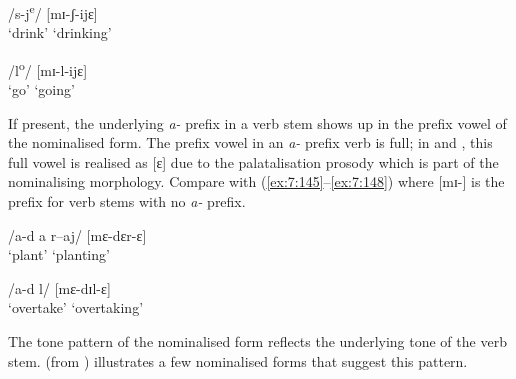 \ea\label{ex:7:150}
 /s-j\textsuperscript{e}/  \hspace{55pt}  [mɪ-ʃ{}-ijɛ]\\
\glt  ‘drink’  \hspace{53pt}   ‘drinking’
\z 

\ea\label{ex:7:151}
  \textup{/l\textsuperscript{o}/ \hspace{65pt}   [mɪ-l-ijɛ}]\\
\glt  ‘go’   \hspace{65pt}   ‘going’
\z 

If present, the underlying \textit{a-} prefix in a verb stem shows up in the prefix vowel of the nominalised form. The prefix vowel in an \textit{a-} prefix verb is full; in  and , this full vowel is realised as [ɛ] due to the palatalisation prosody which is part of the nominalising morphology. Compare with (\ref{ex:7:145}--\ref{ex:7:148}) where [mɪ-] is the prefix for verb stems with no \textit{a-} prefix. 

\ea\label{ex:7:152}
  \textup{/a-d a r–aj/  \hspace{27pt}  [mɛ-dɛr-ɛ}]\\
\glt  ‘plant’ \hspace{55pt}   ‘planting’
\z

\ea\label{ex:7:153}
  \textup{/a-d l/ \hspace{52pt}   [mɛ-dɪl-ɛ}]\\
\glt  ‘overtake’ \hspace{40pt}  ‘overtaking’
\z 

The tone pattern of the nominalised form reflects the underlying tone of the verb stem.   (from \citealt{FriesenMamalis2008}) illustrates a few nominalised forms that suggest this pattern.

\begin{table}
\caption{Nominalised form tone patterns\label{tab:68}}
\end{table}

